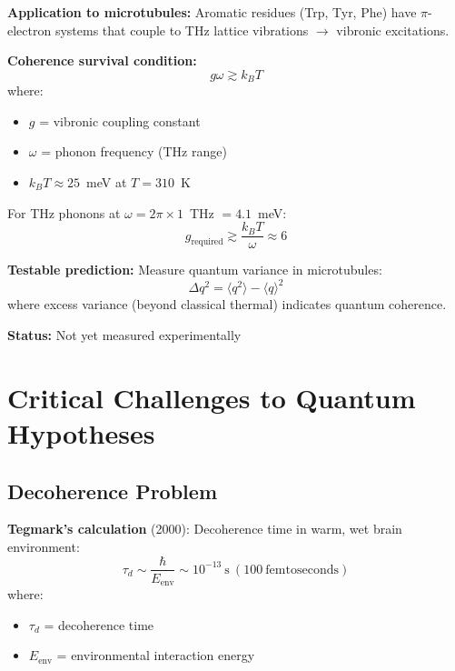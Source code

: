 \textbf{Application to microtubules:} Aromatic residues (Trp, Tyr, Phe) have $\pi$-electron systems that couple to THz lattice vibrations $\rightarrow$ vibronic excitations.

\textbf{Coherence survival condition:}
\begin{equation}
g \omega \gtrsim k_B T
\end{equation}
where:
\begin{itemize}
\item $g$ = vibronic coupling constant
\item $\omega$ = phonon frequency (THz range)
\item $k_B T \approx 25$~meV at $T = 310$~K
\end{itemize}

For THz phonons at $\omega = 2\pi \times 1$~THz $= 4.1$~meV:
\begin{equation}
g_{\mathrm{required}} \gtrsim \frac{k_B T}{\omega} \approx 6
\end{equation}

\textbf{Testable prediction:} Measure quantum variance in microtubules:
\begin{equation}
\Delta q^2 = \langle q^2 \rangle - \langle q \rangle^2
\end{equation}
where excess variance (beyond classical thermal) indicates quantum coherence.

\textbf{Status:} Not yet measured experimentally

\section{Critical Challenges to Quantum Hypotheses}

\subsection{Decoherence Problem}

\textbf{Tegmark's calculation} (2000): Decoherence time in warm, wet brain environment:
\begin{equation}
\tau_d \sim \frac{\hbar}{E_{\mathrm{env}}} \sim 10^{-13}\ \mathrm{s}\ (100\ \mathrm{femtoseconds})
\end{equation}
where:
\begin{itemize}
\item $\tau_d$ = decoherence time
\item $E_{\mathrm{env}}$ = environmental interaction energy
\end{itemize}

